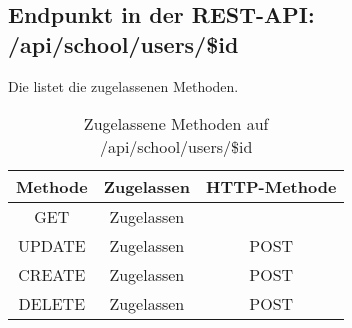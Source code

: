 \subsection{Endpunkt in der REST-API: /api/school/users/\$id}
Die  listet die zugelassenen Methoden. 

\begin{table}[!htbp]
	\begin{tabular}{|c|c|c|}
		\hline
			\textbf{Methode} & \textbf{Zugelassen} & \textbf{HTTP-Methode} \\ \hline
			GET & Zugelassen &  \\ \hline
			UPDATE & Zugelassen & POST \\ \hline 
			CREATE & Zugelassen & POST \\ \hline 
			DELETE & Zugelassen & POST \\ \hline
	\end{tabular}

		\caption{Zugelassene Methoden auf /api/school/users/\$id}
		\label{tab:end:rest:api:school:users:id:meth}
\end{table}


